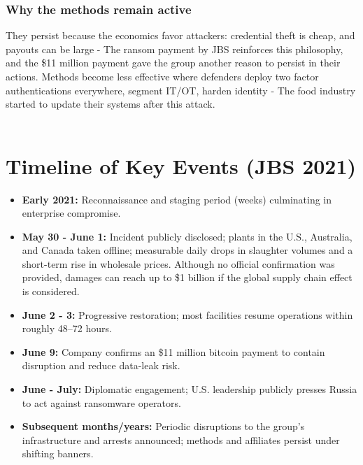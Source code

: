 \documentclass[conference]{IEEEtran}
\begin{document}
\subsubsection{Why the methods remain active}
They persist because the economics favor attackers: credential theft is cheap, and payouts can be large - The ransom payment by JBS reinforces this philosophy, and the \$11 million payment gave the group another reason to persist in their actions. Methods become less effective where defenders deploy two factor authentications everywhere, segment IT/OT, harden identity - The food industry started to update their systems after this attack.
\\\\
\section{Timeline of Key Events (JBS 2021)}
\begin{itemize}
  \item \textbf{Early 2021:} Reconnaissance and staging period (weeks) culminating in enterprise compromise.
  \item \textbf{May 30 - June 1:} Incident publicly disclosed; plants in the U.S., Australia, and Canada taken offline; measurable daily drops in slaughter volumes and a short-term rise in wholesale prices. Although no official confirmation was provided, damages can reach up to \$1 billion if the global supply chain effect is considered.
  \item \textbf{June 2 - 3:} Progressive restoration; most facilities resume operations within roughly 48--72 hours.
  \item \textbf{June 9:} Company confirms an \${11} million bitcoin payment to contain disruption and reduce data-leak risk.
  \item \textbf{June - July:} Diplomatic engagement; U.S. leadership publicly presses Russia to act against ransomware operators.
  \item \textbf{Subsequent months/years:} Periodic disruptions to the group’s infrastructure and arrests announced; methods and affiliates persist under shifting banners.
\end{itemize}
\end{document}

